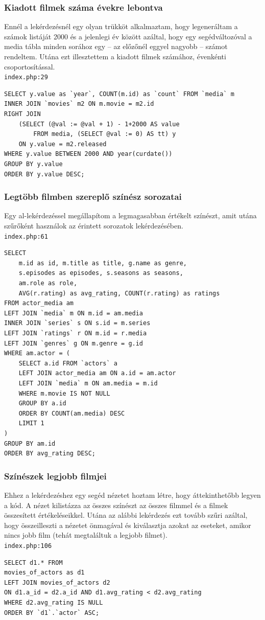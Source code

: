\documentclass[12pt,a4paper,titlepage]{article}  %
\begin{document}
\subsubsection*{Kiadott filmek száma évekre lebontva}

Ennél a lekérdezésnél egy olyan trükköt alkalmaztam, hogy legeneráltam a számok listáját 2000 és a jelenlegi év között azáltal, hogy egy segédváltozóval a media tábla minden sorához egy -- az előzőnél eggyel nagyobb -- számot rendeltem. Utána ezt illesztettem a kiadott filmek számához, évenkénti csoportosítással. \\
\texttt{index.php:29}
\begin{verbatim}
SELECT y.value as `year`, COUNT(m.id) as `count` FROM `media` m
INNER JOIN `movies` m2 ON m.movie = m2.id
RIGHT JOIN 
	(SELECT (@val := @val + 1) - 1+2000 AS value 
		FROM media, (SELECT @val := 0) AS tt) y 
	ON y.value = m2.released
WHERE y.value BETWEEN 2000 AND year(curdate())
GROUP BY y.value
ORDER BY y.value DESC;
\end{verbatim}

\subsubsection*{Legtöbb filmben szereplő színész sorozatai}

Egy al-lekérdezéssel megállapítom a legmagasabban értékelt színészt, amit utána szűrőként használok az érintett sorozatok lekérdezésében. \\
\texttt{index.php:61}
\begin{verbatim}
SELECT 
	m.id as id, m.title as title, g.name as genre, 
	s.episodes as episodes, s.seasons as seasons, 
	am.role as role,
	AVG(r.rating) as avg_rating, COUNT(r.rating) as ratings 
FROM actor_media am
LEFT JOIN `media` m ON m.id = am.media
INNER JOIN `series` s ON s.id = m.series
LEFT JOIN `ratings` r ON m.id = r.media
LEFT JOIN `genres` g ON m.genre = g.id
WHERE am.actor = (
	SELECT a.id FROM `actors` a
	LEFT JOIN actor_media am ON a.id = am.actor
	LEFT JOIN `media` m ON am.media = m.id
	WHERE m.movie IS NOT NULL
	GROUP BY a.id
	ORDER BY COUNT(am.media) DESC
	LIMIT 1
)
GROUP BY am.id
ORDER BY avg_rating DESC;
\end{verbatim}


\subsubsection*{Színészek legjobb filmjei}

Ehhez a lekérdezéshez egy segéd nézetet hoztam létre, hogy áttekinthetőbb legyen a kód. A nézet kilistázza az összes színészt az összes filmmel és a filmek összesített értékeléseikkel. Utána az alábbi lekérdezés ezt tovább szűri azáltal, hogy összeilleszti a nézetet önmagával és kiválasztja azokat az eseteket, amikor nincs jobb film (tehát megtaláltuk a legjobb filmet). \\
\texttt{index.php:106}
\begin{verbatim}
SELECT d1.* FROM 
movies_of_actors as d1
LEFT JOIN movies_of_actors d2 
ON d1.a_id = d2.a_id AND d1.avg_rating < d2.avg_rating
WHERE d2.avg_rating IS NULL
ORDER BY `d1`.`actor` ASC;
\end{verbatim}
\end{document}
